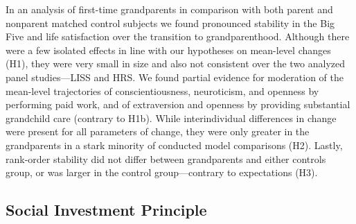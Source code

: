 \documentclass[
  english,
  man, noextraspace]{apa7}
\begin{document}
In an analysis of first-time grandparents in comparison with both parent and nonparent matched control subjects we found pronounced stability in the Big Five and life satisfaction over the transition to grandparenthood. Although there were a few isolated effects in line with our hypotheses on mean-level changes (H1), they were very small in size and also not consistent over the two analyzed panel studies---LISS and HRS. We found partial evidence for moderation of the mean-level trajectories of conscientiousness, neuroticism, and openness by performing paid work, and of extraversion and openness by providing substantial grandchild care (contrary to H1b). While interindividual differences in change were present for all parameters of change, they were only greater in the grandparents in a stark minority of conducted model comparisons (H2). Lastly, rank-order stability did not differ between grandparents and either controls group, or was larger in the control group---contrary to expectations (H3).

\hypertarget{social-investment-principle}{%
\subsection{Social Investment Principle}\label{social-investment-principle}}
\end{document}
